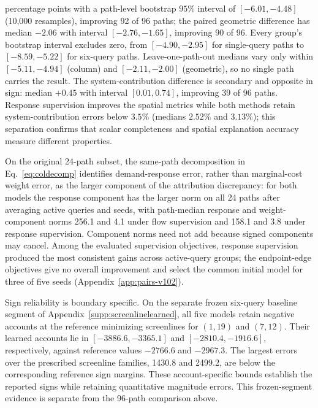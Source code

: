 percentage points with a path-level bootstrap $95\%$ interval of
$[-6.01,-4.48]$ (10,000 resamples), improving 92 of 96 paths; the
paired geometric difference has median $-2.06$ with interval
$[-2.76,-1.65]$, improving 90 of 96. Every group's bootstrap interval
excludes zero, from $[-4.90,-2.95]$ for single-query paths to
$[-8.59,-5.22]$ for six-query paths. Leave-one-path-out medians vary
only within $[-5.11,-4.94]$ (column) and $[-2.11,-2.00]$
(geometric), so no single path carries the result. The
system-contribution difference is secondary and opposite in sign:
median $+0.45$ with interval $[0.01,0.74]$, improving 39 of 96 paths.
Response supervision improves the spatial metrics while both methods
retain system-contribution errors below $3.5\%$ (medians $2.52\%$ and
$3.13\%$); this separation confirms that scalar completeness and
spatial explanation accuracy measure different properties.

On the original 24-path subset, the same-path decomposition in
Eq.~\eqref{eq:coldecomp} identifies demand-response error, rather than
marginal-cost weight error, as the larger component of the attribution
discrepancy: for both models the response component has the larger
norm on all 24 paths after averaging active queries and seeds, with
path-median response and weight-component norms 256.1 and 4.1 under
flow supervision and 158.1 and 3.8 under response supervision.
Component norms need not add because signed components may cancel.
Among the evaluated supervision objectives, response supervision
produced the most consistent gains across active-query groups; the
endpoint-edge objectives give no overall improvement and select the
common initial model for three of five seeds (Appendix~\ref{app:pairs-v102}).

Sign reliability is boundary specific. On the separate frozen six-query
baseline segment of Appendix~\ref{supp:screenlinelearned}, all five models
retain negative accounts at the reference minimizing screenlines for $(1,19)$
and $(7,12)$. Their learned accounts lie in $[-3886.6,-3365.1]$ and
$[-2810.4,-1916.6]$, respectively, against reference values $-2766.6$ and
$-2967.3$. The largest errors over the prescribed screenline families,
1430.8 and 2499.2, are below the corresponding reference sign margins.
These account-specific bounds establish the reported signs while retaining
quantitative magnitude errors. This frozen-segment evidence is separate from
the 96-path comparison above.
